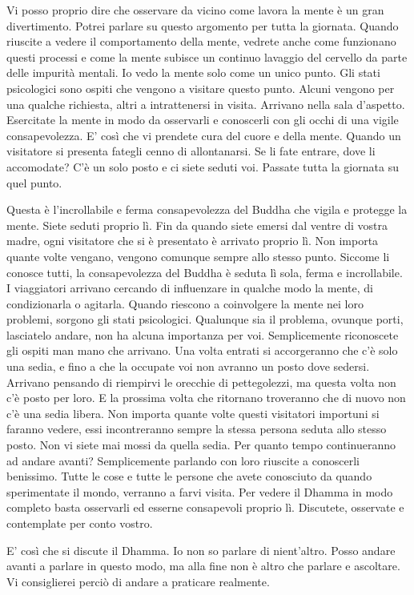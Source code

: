 Vi posso proprio dire che osservare da vicino come lavora la mente è un
gran divertimento. Potrei parlare su questo argomento per tutta la
giornata. Quando riuscite a vedere il comportamento della mente, vedrete
anche come funzionano questi processi e come la mente subisce un
continuo lavaggio del cervello da parte delle impurità mentali. Io vedo
la mente solo come un unico punto. Gli stati psicologici sono ospiti che
vengono a visitare questo punto. Alcuni vengono per una qualche
richiesta, altri a intrattenersi in visita. Arrivano nella sala
d'aspetto. Esercitate la mente in modo da osservarli e conoscerli con
gli occhi di una vigile consapevolezza. E' così che vi prendete cura del
cuore e della mente. Quando un visitatore si presenta fategli cenno di
allontanarsi. Se li fate entrare, dove li accomodate? C'è un solo posto
e ci siete seduti voi. Passate tutta la giornata su quel punto.

Questa è l'incrollabile e ferma consapevolezza del Buddha che vigila e
protegge la mente. Siete seduti proprio lì. Fin da quando siete emersi
dal ventre di vostra madre, ogni visitatore che si è presentato è
arrivato proprio lì. Non importa quante volte vengano, vengono comunque
sempre allo stesso punto. Siccome li conosce tutti, la consapevolezza
del Buddha è seduta lì sola, ferma e incrollabile. I viaggiatori
arrivano cercando di influenzare in qualche modo la mente, di
condizionarla o agitarla. Quando riescono a coinvolgere la mente nei
loro problemi, sorgono gli stati psicologici. Qualunque sia il problema,
ovunque porti, lasciatelo andare, non ha alcuna importanza per voi.
Semplicemente riconoscete gli ospiti man mano che arrivano. Una volta
entrati si accorgeranno che c'è solo una sedia, e fino a che la occupate
voi non avranno un posto dove sedersi. Arrivano pensando di riempirvi le
orecchie di pettegolezzi, ma questa volta non c'è posto per loro. E la
prossima volta che ritornano troveranno che di nuovo non c'è una sedia
libera. Non importa quante volte questi visitatori importuni si faranno
vedere, essi incontreranno sempre la stessa persona seduta allo stesso
posto. Non vi siete mai mossi da quella sedia. Per quanto tempo
continueranno ad andare avanti? Semplicemente parlando con loro riuscite
a conoscerli benissimo. Tutte le cose e tutte le persone che avete
conosciuto da quando sperimentate il mondo, verranno a farvi visita. Per
vedere il Dhamma in modo completo basta osservarli ed esserne
consapevoli proprio lì. Discutete, osservate e contemplate per conto
vostro.

E' così che si discute il Dhamma. Io non so parlare di nient'altro.
Posso andare avanti a parlare in questo modo, ma alla fine non è altro
che parlare e ascoltare. Vi consiglierei perciò di andare a praticare
realmente.


